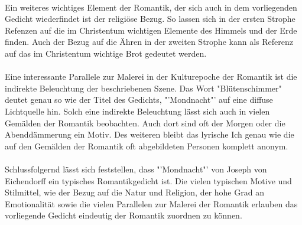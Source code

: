 \documentclass[11pt]{article}
\begin{document}
\paragraph{}
Ein weiteres wichtiges Element der Romantik, der sich auch in dem vorliegenden Gedicht wiederfindet ist der religiöse Bezug. So lassen sich in der ersten Strophe Refenzen auf die im Christentum wichtigen Elemente des Himmels und der Erde finden. Auch der Bezug auf die Ähren in der zweiten Strophe kann als Referenz auf das im Christentum wichtige Brot gedeutet werden.
\paragraph{}
Eine interessante Parallele zur Malerei in der Kulturepoche der Romantik ist die indirekte Beleuchtung der beschriebenen Szene. Das Wort "Blütenschimmer" deutet genau so wie der Titel des Gedichts, "'Mondnacht"' auf eine diffuse Lichtquelle hin. Solch eine indirekte Beleuchtung lässt sich auch in vielen Gemälden der Romantik beobachten. Auch dort sind oft der Morgen oder die Abenddämmerung ein Motiv. Des weiteren bleibt das lyrische Ich genau wie die auf den Gemälden der Romantik oft abgebildeten Personen komplett anonym.
\paragraph{}
Schlussfolgernd lässt sich feststellen, dass "'Mondnacht"' von Joseph von Eichendorff ein typisches Romantikgedicht ist. Die vielen typischen Motive und Stilmittel, wie der Bezug auf die Natur und Religion, der hohe Grad an Emotionalität sowie die vielen Parallelen zur Malerei der Romantik erlauben das vorliegende Gedicht eindeutig der Romantik zuordnen zu können.
\end{document}
